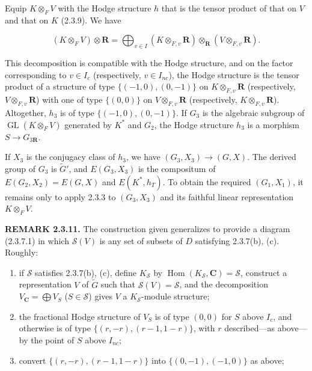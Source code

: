 \documentclass[10pt,a4paper]{article}
\begin{document}
Equip \(K\otimes_F V\) with the Hodge structure \(h\) that is the tensor product of that on \(V\) and that on \(K\) (2.3.9). We have

\[
(K\otimes_F V)\otimes\mathbf R
=\bigoplus_{v\in I}(K\otimes_{F,v}\mathbf R)\otimes_{\mathbf R}(V\otimes_{F,v}\mathbf R).
\]

This decomposition is compatible with the Hodge structure, and on the factor corresponding to \(v\in I_c\) (respectively, \(v\in I_{nc}\)), the Hodge structure is the tensor product of a structure of type \(\{(-1,0),(0,-1)\}\) on \(K\otimes_{F,v}\mathbf R\) (respectively, \(V\otimes_{F,v}\mathbf R\)) with one of type \(\{(0,0)\}\) on \(V\otimes_{F,v}\mathbf R\) (respectively, \(K\otimes_{F,v}\mathbf R\)). Altogether, \(h_3\) is of type \(\{(-1,0),(0,-1)\}\). If \(G_3\) is the algebraic subgroup of \(\operatorname{GL}(K\otimes_F V)\) generated by \(K^*\) and \(G_2\), the Hodge structure \(h_3\) is a morphism \(S\to G_{3\mathbf R}\).

If \(X_3\) is the conjugacy class of \(h_3\), we have \((G_3,X_3)\to(G,X)\). The derived group of \(G_3\) is \(\widetilde G'\), and \(E(G_3,X_3)\) is the compositum of \(E(G_2,X_2)=E(G,X)\) and \(E(K^*,h_T)\). To obtain the required \((G_1,X_1)\), it remains only to apply 2.3.3 to \((G_3,X_3)\) and its faithful linear representation \(K\otimes_F V\).

\textbf{REMARK 2.3.11.} The construction given generalizes to provide a diagram (2.3.7.1) in which \(\mathscr S(V)\) is any set of subsets of \(D\) satisfying 2.3.7(b), (c). Roughly:

\begin{enumerate}
\def\labelenumi{(\alph{enumi})}
\item
  if \(\mathscr S\) satisfies 2.3.7(b), (c), define \(K_{\mathscr S}\) by \(\operatorname{Hom}(K_{\mathscr S},\mathbf C)=\mathscr S\), construct a representation \(V\) of \(\widetilde G\) such that \(\mathscr S(V)=\mathscr S\), and the decomposition \(V_{\mathbf C}=\bigoplus V_S\) (\(S\in\mathscr S\)) gives \(V\) a \(K_{\mathscr S}\)-module structure;
\item
  the fractional Hodge structure of \(V_S\) is of type \((0,0)\) for \(S\) above \(I_c\), and otherwise is of type \(\{(r,-r),(r-1,1-r)\}\), with \(r\) described---as above---by the point of \(S\) above \(I_{nc}\);
\item
  convert \(\{(r,-r),(r-1,1-r)\}\) into \(\{(0,-1),(-1,0)\}\) as above;
\end{enumerate}
\end{document}
